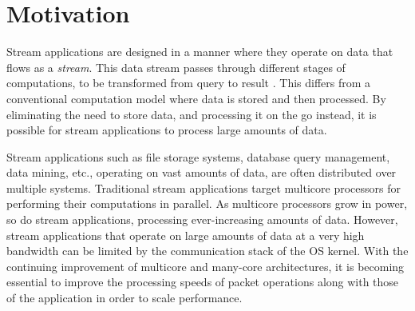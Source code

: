 \documentclass[conference]{IEEEtran}
\newcommand{\comment}[1]{}
\begin{document}


%
\IEEEpeerreviewmaketitle
\setlength{\textfloatsep}{15pt}
\section{Motivation}

Stream applications are designed in a manner where they operate on data that flows as a \textit{stream}. This data stream passes through different stages of computations, to be transformed from query to result \cite{Thies:2002:SLS:647478.727935} \cite{Halbwachs91thesynchronous} \cite{Stephens95asurvey}. This differs from a conventional computation model where data is stored and then processed. By eliminating the need to store data, and processing it on the go instead, it is possible for stream applications to process large amounts of data.

Stream applications such as file storage systems, database query management, data mining, etc., operating on vast amounts of data, are often distributed over multiple systems. Traditional stream applications target multicore processors for performing their computations in parallel. As multicore processors grow in power, so do stream applications, processing ever-increasing amounts of data. However, stream applications that operate on large amounts of data at a very high bandwidth can be limited by the communication stack of the OS kernel\cite{Wu:2007:PPB:1323954.1323957}\cite{Wu:2007:PAL:1227865.1228021}\cite{Dobrescu09routebricks:exploiting}\cite{Han:2010:PGS:1851275.1851207}\cite{Kohler2000}. With the continuing improvement of multicore and many-core architectures, it is becoming essential to improve the processing speeds of packet operations along with those of the application in order to scale performance.
\comment{
When performing packet processing operations for communication intensive stream applications, a major challenge is the high levels of performance required. These applications process large numbers of data streams in real time.  If the communication system cannot keep up with the rate at which packets arrive, then they must be dropped or remain unprocessed.
}
\end{document}
